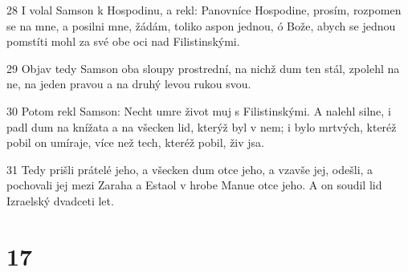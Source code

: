 \par 28 I volal Samson k Hospodinu, a rekl: Panovníce Hospodine, prosím, rozpomen se na mne, a posilni mne, žádám, toliko aspon jednou, ó Bože, abych se jednou pomstíti mohl za své obe oci nad Filistinskými.
\par 29 Objav tedy Samson oba sloupy prostrední, na nichž dum ten stál, zpolehl na ne, na jeden pravou a na druhý levou rukou svou.
\par 30 Potom rekl Samson: Necht umre život muj s Filistinskými. A nalehl silne, i padl dum na knížata a na všecken lid, kterýž byl v nem; i bylo mrtvých, kteréž pobil on umíraje, více než tech, kteréž pobil, živ jsa.
\par 31 Tedy prišli prátelé jeho, a všecken dum otce jeho, a vzavše jej, odešli, a pochovali jej mezi Zaraha a Estaol v hrobe Manue otce jeho. A on soudil lid Izraelský dvadceti let.

\chapter{17}

